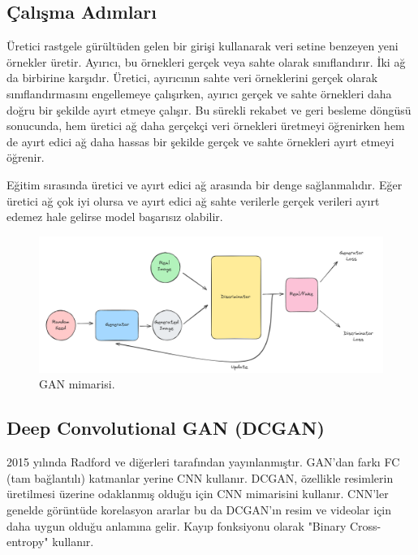 \subsection{Çalışma Adımları}
Üretici rastgele gürültüden gelen bir girişi kullanarak veri setine benzeyen yeni örnekler üretir. Ayırıcı, bu örnekleri gerçek veya sahte olarak sınıflandırır. İki ağ da birbirine karşıdır. Üretici, ayırıcının sahte veri örneklerini gerçek olarak sınıflandırmasını engellemeye çalışırken, ayırıcı gerçek ve sahte örnekleri daha doğru bir şekilde ayırt etmeye çalışır. Bu sürekli rekabet ve geri besleme döngüsü sonucunda, hem üretici ağ daha gerçekçi veri örnekleri üretmeyi öğrenirken hem de ayırt edici ağ daha hassas bir şekilde gerçek ve sahte örnekleri ayırt etmeyi öğrenir.

Eğitim sırasında üretici ve ayırt edici ağ arasında bir denge sağlanmalıdır. Eğer üretici ağ çok iyi olursa ve ayırt edici ağ sahte verilerle gerçek verileri ayırt edemez hale gelirse model başarısız olabilir. 

\begin{figure}[h]
    \centering
    \includegraphics[width=1\textwidth]{images/gan_architecture.png}
    \caption{GAN mimarisi.}
    \label{fig:enter-label}
\end{figure}

\newpage

\subsection{Deep Convolutional GAN (DCGAN)}
2015 yılında Radford ve diğerleri tarafından yayınlanmıştır. GAN'dan farkı FC (tam bağlantılı) katmanlar yerine CNN kullanır. DCGAN, özellikle resimlerin üretilmesi üzerine odaklanmış olduğu için CNN mimarisini kullanır. CNN'ler genelde görüntüde korelasyon ararlar bu da DCGAN'ın resim ve videolar için daha uygun olduğu anlamına gelir. Kayıp fonksiyonu olarak "Binary Cross-entropy" kullanır.

\newpage

